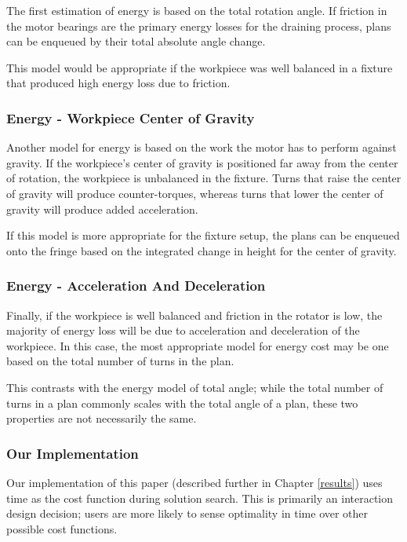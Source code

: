 The first estimation of energy is based on the total rotation angle. If friction in the motor bearings are the primary energy losses for the draining process, plans can be enqueued by their total absolute angle change.

This model would be appropriate if the workpiece was well balanced in a fixture that produced high energy loss due to friction.

		\subsubsection{Energy - Workpiece Center of Gravity}

Another model for energy is based on the work the motor has to perform against gravity. If the workpiece's center of gravity is positioned far away from the center of rotation, the workpiece is unbalanced in the fixture. Turns that raise the center of gravity will produce counter-torques, whereas turns that lower the center of gravity will produce added acceleration.

If this model is more appropriate for the fixture setup, the plans can be enqueued onto the fringe based on the integrated change in height for the center of gravity.

		\subsubsection{Energy - Acceleration And Deceleration}

Finally, if the workpiece is well balanced and friction in the rotator is low, the majority of energy loss will be due to acceleration and deceleration of the workpiece. In this case, the most appropriate model for energy cost may be one based on the total number of turns in the plan.

This contrasts with the energy model of total angle; while the total number of turns in a plan commonly scales with the total angle of a plan, these two properties are not necessarily the same.

		\subsubsection{Our Implementation}

Our implementation of this paper (described further in Chapter \ref{results}) uses time as the cost function during solution search. This is primarily an interaction design decision; users are more likely to sense optimality in time over other possible cost functions.

